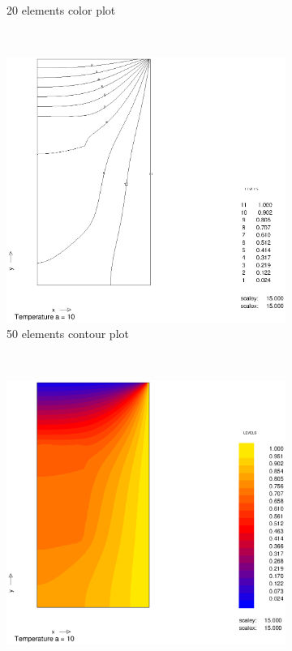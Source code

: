 \documentclass[10pt,a4paper]{article}
\begin{document}
\begin{figure}[h]
\begin{subfigure}[b]{0.45\textwidth}
                \caption{20 elements color plot}
                \label{fig:colplot_a10_20el}
        \end{subfigure}
        ~           
        \begin{subfigure}[b]{0.45\textwidth}
                \includegraphics[width=\textwidth]{cont_a10_50el}
                \caption{50 elements contour plot}
                \label{fig:col_a10_50el}
        \end{subfigure}      
        ~
        \begin{subfigure}[b]{0.45\textwidth}
                \includegraphics[width=\textwidth]{colplot_a10_50el}

\end{subfigure}
\end{figure}
\end{document}
